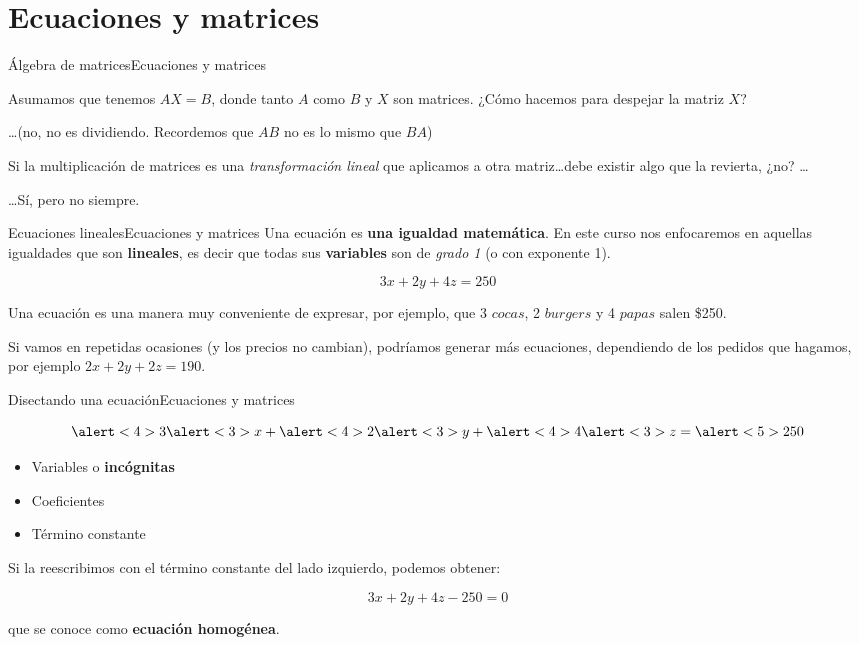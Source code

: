 \documentclass[spanish, c]{beamer}
\begin{document}
\section{Ecuaciones y matrices}

\begin{frame}{Álgebra de matrices}{Ecuaciones y matrices}

    Asumamos que tenemos $AX = B$, donde tanto $A$ como $B$ y $X$ son matrices. ¿Cómo hacemos para despejar la matriz $X$?

    \bigskip

    \dots {\scriptsize (no, no es dividiendo. Recordemos que $AB$ no es lo mismo que $BA$)}

    \bigskip

    Si la multiplicación de matrices es una \textit{transformación lineal} que aplicamos a otra matriz\dots debe existir algo que la revierta, ¿no? \dots

    \bigskip

    \dots Sí, pero no siempre.

\end{frame}

\begin{frame}{Ecuaciones lineales}{Ecuaciones y matrices}
    Una \alert{ecuación} es \textbf{una igualdad matemática}. En este curso nos enfocaremos en aquellas igualdades que son \textbf{lineales}, es decir que todas sus \textbf{variables} son de \textit{grado 1} (o con exponente 1). \pause

    \bigskip

    \[3x + 2y + 4z = 250\] \pause

    Una ecuación es una manera muy conveniente de expresar, por ejemplo, que 3 $cocas$, 2 $burgers$ y 4 $papas$ salen \$250. \pause

    Si vamos en repetidas ocasiones (y los precios no cambian), podríamos generar más ecuaciones, dependiendo de los pedidos que hagamos, por ejemplo $2x + 2y + 2z = 190$.
\end{frame}

\begin{frame}{Disectando una ecuación}{Ecuaciones y matrices}

    \[\alert<4>{3}\alert<3>{x} + \alert<4>{2}\alert<3>{y} + \alert<4>{4}\alert<3>{z} = \alert<5>{250}\] \pause

    \begin{itemize}[<+->]
        \item \alert<3>{Variables} o \textbf{incógnitas}
        \item \alert<4>{Coeficientes}
        \item \alert<5>{Término constante}
    \end{itemize} \pause

    Si la reescribimos con el término constante del lado izquierdo, podemos obtener:

    \[3x + 2y + 4z -250 = 0\]

    que se conoce como \textbf{ecuación homogénea}.  
\end{frame}
\end{document}
